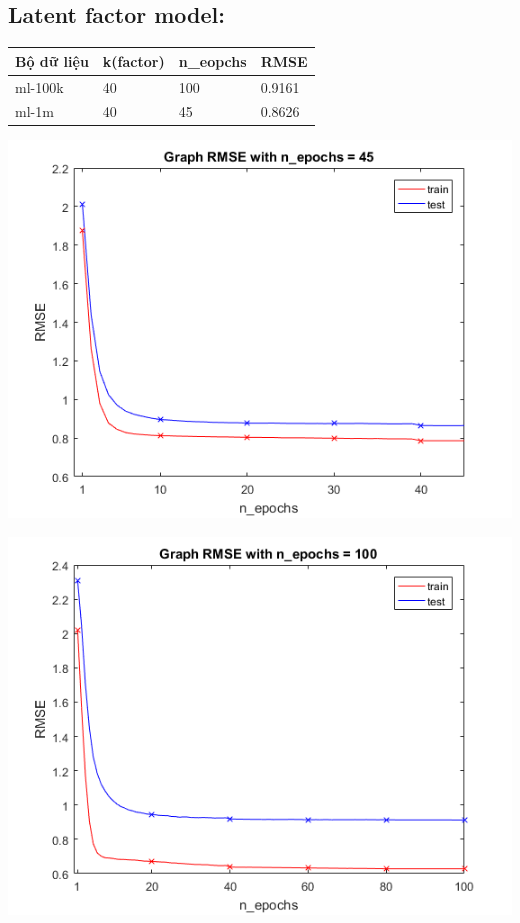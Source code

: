 \documentclass[a0,portrait,11pt]{a0poster}
\begin{document}
\begin{mybox}
\begin{multicols}{3}
\begin{mybox}
\subsection*{Latent factor model:}
\begin{center}
\begin{tabular}{|l|l|l|l|}
\hline
Bộ dữ liệu & k(factor) & n\_eopchs & RMSE \\
\hline
ml-100k & 40 & 100 & 0.9161 \\
ml-1m & 40 & 45 & 0.8626 \\
\hline
\end{tabular}
\end{center}
\begin{minipage}[c]{0.5\linewidth}
\includegraphics[width=1.0\linewidth]{RMSE!.png}
\end{minipage}
\begin{minipage}[c]{0.5\linewidth}
\includegraphics[width=1.0\linewidth]{RMSE.png}
\end{minipage}
\begin{minipage}[c]{0.5\linewidth}
\end{minipage}
\end{mybox}
\begin{mybox}

\end{mybox}
\end{multicols}
\end{mybox}
\end{document}
